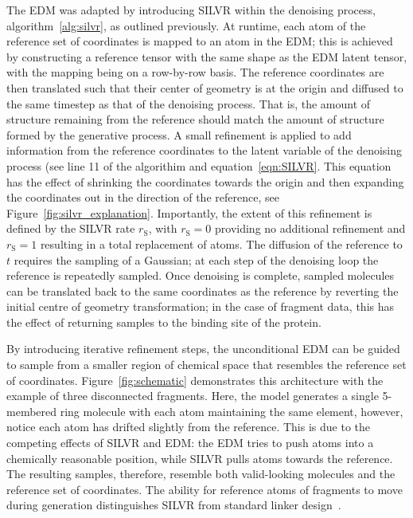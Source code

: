 \documentclass[journal=jacsat,manuscript=article]{achemso}
\begin{document}
The EDM was adapted by introducing SILVR within the denoising process, algorithm~\ref{alg:silvr}, as outlined previously. At runtime, each atom of the reference set of coordinates is mapped to an atom in the EDM; this is achieved by constructing a reference tensor with the same shape as the EDM latent tensor, with the mapping being on a row-by-row basis. The reference coordinates are then translated such that their center of geometry is at the origin and diffused to the same timestep as that of the denoising process. That is, the amount of structure remaining from the reference should match the amount of structure formed by the generative process. A small refinement is applied to add information from the reference coordinates to the latent variable of the denoising process (see line 11 of the algorithim and equation~\ref{eqn:SILVR}. This equation has the effect of shrinking the coordinates towards the origin and then expanding the coordinates out in the direction of the reference, see Figure~\ref{fig:silvr_explanation}. Importantly, the extent of this refinement is defined by the SILVR rate $r_{\mathrm{S}}$, with $r_{\mathrm{S}}=0$ providing no additional refinement and $r_{\mathrm{S}}=1$ resulting in a total replacement of atoms. The diffusion of the reference to $t$ requires the sampling of a Gaussian; at each step of the denoising loop the reference is repeatedly sampled.  Once denoising is complete, sampled molecules can be translated back to the same coordinates as the reference by reverting the initial centre of geometry transformation; in the case of fragment data, this has the effect of returning samples to the binding site of the protein.

By introducing iterative refinement steps, the unconditional EDM can be guided to sample from a smaller region of chemical space that resembles the reference set of coordinates. Figure~\ref{fig:schematic} demonstrates this architecture with the example of three disconnected fragments. Here, the model generates a single 5-membered ring molecule with each atom maintaining the same element, however, notice each atom has drifted slightly from the reference. This is due to the competing effects of SILVR and EDM: the EDM tries to push atoms into a chemically reasonable position, while SILVR pulls atoms towards the reference. The resulting samples, therefore, resemble both valid-looking molecules and the reference set of coordinates. The ability for reference atoms of fragments to move during generation distinguishes SILVR from standard linker design~\cite{guo2023linkinvent, igashov2022equivariant}.
\end{document}
